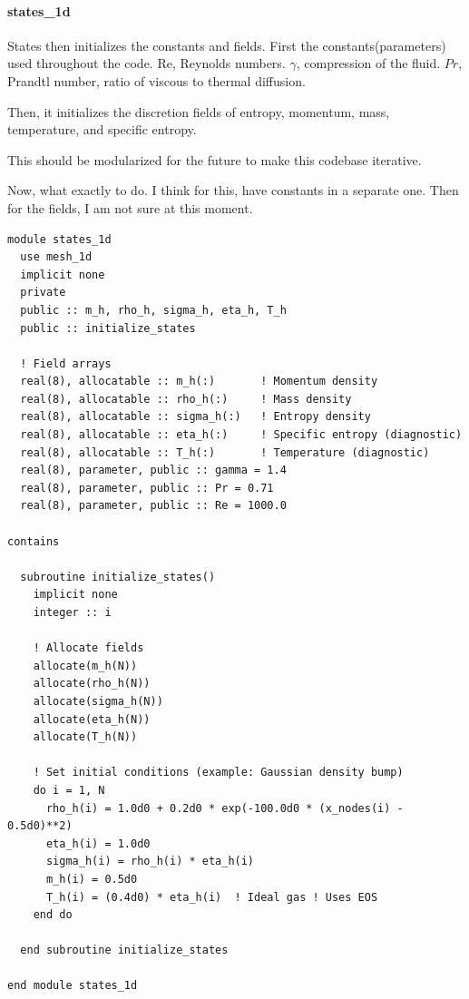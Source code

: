 \paragraph{states\_1d}
States then initializes the constants and fields.
First the constants(parameters) used throughout the code. Re, Reynolds numbers. $\gamma$, compression of the fluid. $Pr$, Prandtl number, ratio of viscous to thermal diffusion.

Then, it initializes the discretion fields of entropy, momentum, mass, temperature, and specific entropy.

This should be modularized for the future to make this codebase iterative.

Now, what exactly to do. I think for this, have constants in a separate one. Then for the fields, I am not sure at this moment.
\begin{lstlisting}[style=FORTRAN, caption=states\_1d.f90]
module states_1d
  use mesh_1d
  implicit none
  private
  public :: m_h, rho_h, sigma_h, eta_h, T_h
  public :: initialize_states

  ! Field arrays
  real(8), allocatable :: m_h(:)       ! Momentum density
  real(8), allocatable :: rho_h(:)     ! Mass density
  real(8), allocatable :: sigma_h(:)   ! Entropy density
  real(8), allocatable :: eta_h(:)     ! Specific entropy (diagnostic)
  real(8), allocatable :: T_h(:)       ! Temperature (diagnostic)
  real(8), parameter, public :: gamma = 1.4
  real(8), parameter, public :: Pr = 0.71
  real(8), parameter, public :: Re = 1000.0

contains

  subroutine initialize_states()
    implicit none
    integer :: i

    ! Allocate fields
    allocate(m_h(N))
    allocate(rho_h(N))
    allocate(sigma_h(N))
    allocate(eta_h(N))
    allocate(T_h(N))

    ! Set initial conditions (example: Gaussian density bump)
    do i = 1, N
      rho_h(i) = 1.0d0 + 0.2d0 * exp(-100.0d0 * (x_nodes(i) - 0.5d0)**2)
      eta_h(i) = 1.0d0
      sigma_h(i) = rho_h(i) * eta_h(i)
      m_h(i) = 0.5d0
      T_h(i) = (0.4d0) * eta_h(i)  ! Ideal gas ! Uses EOS
    end do

  end subroutine initialize_states

end module states_1d
\end{lstlisting}
